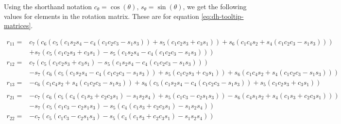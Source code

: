 Using the shorthand notation $c_\theta = \cos(\theta)$, $s_\theta = \sin(\theta)$, we get the following values for elements in the rotation matrix. These are for equation \ref{eq:dh-tooltip-matrices}.

\begin{equation}
    \begin{split}
        r_{11} =& c_{7} \left(c_{6} \left(c_{5} \left(c_{1} s_{2} s_{4} - c_{4} \left(c_{1} c_{2} c_{3} - s_{1} s_{3}\right)\right) + s_{5} \left(c_{1} c_{2} s_{3} + c_{3} s_{1}\right)\right) + s_{6} \left(c_{1} c_{4} s_{2} + s_{4} \left(c_{1} c_{2} c_{3} - s_{1} s_{3}\right)\right)\right) \\
            &+ s_{7} \left(c_{5} \left(c_{1} c_{2} s_{3} + c_{3} s_{1}\right) - s_{5} \left(c_{1} s_{2} s_{4} - c_{4} \left(c_{1} c_{2} c_{3} - s_{1} s_{3}\right)\right)\right) \\
        r_{12} =& c_{7} \left(c_{5} \left(c_{1} c_{2} s_{3} + c_{3} s_{1}\right) - s_{5} \left(c_{1} s_{2} s_{4} - c_{4} \left(c_{1} c_{2} c_{3} - s_{1} s_{3}\right)\right)\right) \\
            &- s_{7} \left(c_{6} \left(c_{5} \left(c_{1} s_{2} s_{4} - c_{4} \left(c_{1} c_{2} c_{3} - s_{1} s_{3}\right)\right) + s_{5} \left(c_{1} c_{2} s_{3} + c_{3} s_{1}\right)\right) + s_{6} \left(c_{1} c_{4} s_{2} + s_{4} \left(c_{1} c_{2} c_{3} - s_{1} s_{3}\right)\right)\right) \\
        r_{13} =& - c_{6} \left(c_{1} c_{4} s_{2} + s_{4} \left(c_{1} c_{2} c_{3} - s_{1} s_{3}\right)\right) + s_{6} \left(c_{5} \left(c_{1} s_{2} s_{4} - c_{4} \left(c_{1} c_{2} c_{3} - s_{1} s_{3}\right)\right) + s_{5} \left(c_{1} c_{2} s_{3} + c_{3} s_{1}\right)\right) \\
        \\
        r_{21} =& - c_{7} \left(c_{6} \left(c_{5} \left(c_{4} \left(c_{1} s_{3} + c_{2} c_{3} s_{1}\right) - s_{1} s_{2} s_{4}\right) + s_{5} \left(c_{1} c_{3} - c_{2} s_{1} s_{3}\right)\right) - s_{6} \left(c_{4} s_{1} s_{2} + s_{4} \left(c_{1} s_{3} + c_{2} c_{3} s_{1}\right)\right)\right) \\
            &- s_{7} \left(c_{5} \left(c_{1} c_{3} - c_{2} s_{1} s_{3}\right) - s_{5} \left(c_{4} \left(c_{1} s_{3} + c_{2} c_{3} s_{1}\right) - s_{1} s_{2} s_{4}\right)\right) \\
        r_{22} =& - c_{7} \left(c_{5} \left(c_{1} c_{3} - c_{2} s_{1} s_{3}\right) - s_{5} \left(c_{4} \left(c_{1} s_{3} + c_{2} c_{3} s_{1}\right) - s_{1} s_{2} s_{4}\right)\right) \\

\end{split}
\end{equation}
